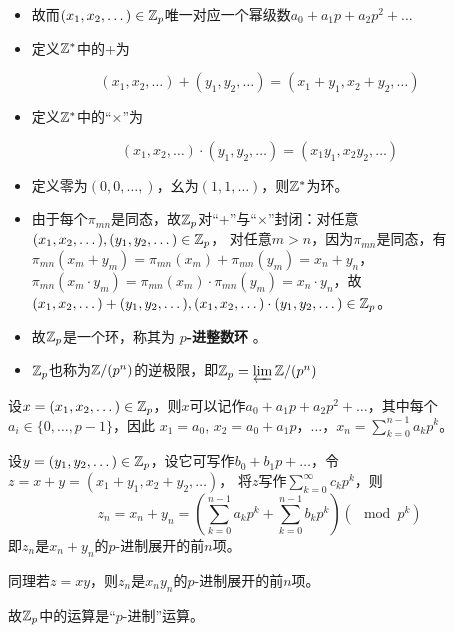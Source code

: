 \documentclass[11pt]{article}
\begin{document}
\begin{examplle}[]
\begin{enumerate}
\begin{itemize}
\item 故而\((x_1,x_2,\dots)\in\mathbb{Z}_p\)唯一对应一个幂级数\(a_0+a_1p+a_2p^2+\dots\)

\item 定义\(\mathbb{Z}^*\)中的+为
\end{itemize}
\begin{equation*}
(x_1,x_2,\dots)+(y_1,y_2,\dots)=(x_1+y_1,x_2+y_2,\dots)
\end{equation*}
\begin{itemize}
\item 定义\(\mathbb{Z}^*\)中的``\(\times\)''为
\end{itemize}
\begin{equation*}
(x_1,x_2,\dots)\cdot(y_1,y_2,\dots)=(x_1y_1,x_2y_2,\dots)
\end{equation*}
\begin{itemize}
\item 定义零为\((0,0,\dots,)\)，幺为\((1,1,\dots)\)，则\(\mathbb{Z}^*\)为环。

\item 由于每个\(\pi_{mn}\)是同态，故\(\mathbb{Z}_p\)对“+”与“\(\times\)”封闭：对任意\((x_1,x_2,\dots),(y_1,y_2,\dots)\in\mathbb{Z}_p\)，
对任意\(m>n\)，因为\(\pi_{mn}\)是同态，有\(\pi_{mn}(x_m+y_m)=\pi_{mn}(x_m)+\pi_{mn}(y_m)=x_n+y_n\)，
\(\pi_{mn}(x_m\cdot y_m)=\pi_{mn}(x_m)\cdot\pi_{mn}(y_m)=x_n\cdot y_n\)，故\((x_1,x_2,\dots)+(y_1,y_2,\dots),(x_1,x_2,\dots)\cdot(y_1,y_2,\dots)\in\mathbb{Z}_p\)。
\item 故\(\mathbb{Z}_p\)是一个环，称其为 \textbf{\(p\)-进整数环} 。
\item \(\mathbb{Z}_p\)也称为\(\mathbb{Z}/(p^n)\)的逆极限，即\(\mathbb{Z}_p=\varprojlim\mathbb{Z}/(p^n)\)
\end{itemize}
\end{enumerate}
\end{examplle}

\begin{remark}
设\(x=(x_1,x_2,\dots)\in\mathbb{Z}_p\)，则\(x\)可以记作\(a_0+a_1p+a_2p^2+\dots\)，其中每个\(a_i\in\{0,\dots,p-1\}\)，因此
\(x_1=a_0\), \(x_2=a_0+a_1p\)，\(\dots\)，\(x_n=\sum_{k=0}^{n-1}a_kp^k\)。

设\(y=(y_1,y_2,\dots)\in\mathbb{Z}_p\)，设它可写作\(b_0+b_1p+\dots\)，令\(z=x+y=(x_1+y_1,x_2+y_2,\dots)\)，
将\(z\)写作\(\sum_{k=0}^\infty c_kp^k\)，则
\begin{equation*}
z_n=x_n+y_n=(\sum_{k=0}^{n-1}a_kp^k+\sum_{k=0}^{n-1}b_kp^k)(\mod p^k)
\end{equation*}
即\(z_n\)是\(x_n+y_n\)的\(p\)-进制展开的前\(n\)项。

同理若\(z=xy\)，则\(z_n\)是\(x_ny_n\)的\(p\)-进制展开的前\(n\)项。

故\(\mathbb{Z}_p\)中的运算是“\(p\)-进制”运算。
\end{remark}
\end{document}
